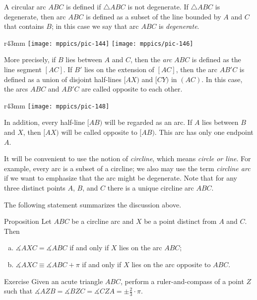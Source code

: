 A circular arc $ABC$ is defined if $\triangle ABC$ is not degenerate.
If $\triangle ABC$ is degenerate, then arc $ABC$ is defined as a subset of the line bounded by $A$ and $C$ that contains $B$;
in this case we say that arc $ABC$ is \emph{degenerate}.


\begin{wrapfigure}{r}{43mm}
\vskip-2mm
\centering
\texttt{[image: mppics/pic-144]}
\vskip4mm
\texttt{[image: mppics/pic-146]}
\end{wrapfigure}

More precisely, if $B$ lies between $A$ and $C$, then the {}\emph{arc} $ABC$ is defined as 
the line segment $[AC]$.
If $B'$ lies on the extension of $[AC]$,
then the arc $AB'C$ is defined as a union of disjoint half-lines $[AX)$ and $[CY)$ in $(AC)$.
In this case, the arcs $ABC$ and $AB'C$ are called opposite to each other.

\begin{wrapfigure}[2]{r}{43mm}
\vskip-0mm
\centering
\texttt{[image: mppics/pic-148]}
\end{wrapfigure}

In addition, every half-line $[AB)$ will be regarded as an arc.
If $A$ lies between $B$ and $X$, then $[AX)$ will be called opposite to $[AB)$.
This arc has only one endpoint $A$.

It will be convenient to use the notion of 
\emph{circline},
which means \textit{circle or line}.
For example, every arc is a subset of a circline;
we also may use the term \emph{circline arc} if we want to emphasize that the arc might be degenerate.
Note that for any three distinct points $A$, $B$, and $C$ there is a unique circline arc $ABC$.

The following statement summarizes the discussion above.

\begin{thm}{Proposition}\label{prop:arcs}
Let $ABC$ be a circline arc and $X$ be a point distinct from $A$ and $C$.
Then 
\begin{enumerate}[(a)]
\item $\measuredangle AXC=\measuredangle ABC$ if and only if $X$ lies on the arc $ABC$;
\item $\measuredangle AXC\equiv\measuredangle ABC+\pi$ if and only if $X$ lies on the arc opposite to $ABC$.
\end{enumerate}
\end{thm}

\begin{thm}{Exercise}\label{ex:3x120}
Given an acute triangle $ABC$,
perform a ruler-and-compass of a point $Z$ such that
$\measuredangle AZB
= \measuredangle BZC
= \measuredangle CZA
=\pm\tfrac23\cdot\pi$.
\end{thm}

